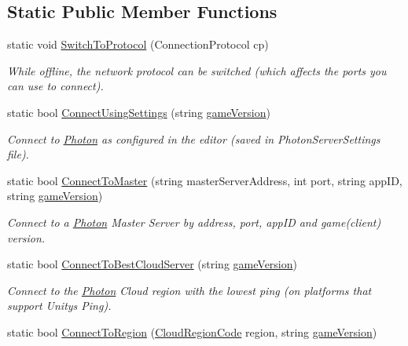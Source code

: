 \subsection*{Static Public Member Functions}
\begin{DoxyCompactItemize}
\item 
static void \hyperlink{class_photon_network_af4ff9e4128181a1a4974c20bf899a4c4}{Switch\+To\+Protocol} (Connection\+Protocol cp)
\begin{DoxyCompactList}\small\item\em While offline, the network protocol can be switched (which affects the ports you can use to connect). \end{DoxyCompactList}\item 
static bool \hyperlink{class_photon_network_a0fdb79bcce45801ec81fbe56ffb939ec}{Connect\+Using\+Settings} (string \hyperlink{class_photon_network_a2a8b1690325d73930d6bc8b99d8e736d}{game\+Version})
\begin{DoxyCompactList}\small\item\em Connect to \hyperlink{namespace_photon}{Photon} as configured in the editor (saved in Photon\+Server\+Settings file). \end{DoxyCompactList}\item 
static bool \hyperlink{class_photon_network_a981e7244e915f41e18cb9da5f12fc858}{Connect\+To\+Master} (string master\+Server\+Address, int port, string app\+ID, string \hyperlink{class_photon_network_a2a8b1690325d73930d6bc8b99d8e736d}{game\+Version})
\begin{DoxyCompactList}\small\item\em Connect to a \hyperlink{namespace_photon}{Photon} Master Server by address, port, app\+ID and game(client) version. \end{DoxyCompactList}\item 
static bool \hyperlink{class_photon_network_afba456bbc9d1525b87eb060c959af2b6}{Connect\+To\+Best\+Cloud\+Server} (string \hyperlink{class_photon_network_a2a8b1690325d73930d6bc8b99d8e736d}{game\+Version})
\begin{DoxyCompactList}\small\item\em Connect to the \hyperlink{namespace_photon}{Photon} Cloud region with the lowest ping (on platforms that support Unity\textquotesingle{}s Ping). \end{DoxyCompactList}\item 
static bool \hyperlink{class_photon_network_a84b7be74d130b19eeeb1d7b4e8193ad4}{Connect\+To\+Region} (\hyperlink{_enums_8cs_af823e3be9567fa753720895120c9819b}{Cloud\+Region\+Code} region, string \hyperlink{class_photon_network_a2a8b1690325d73930d6bc8b99d8e736d}{game\+Version})

\end{DoxyCompactItemize}
